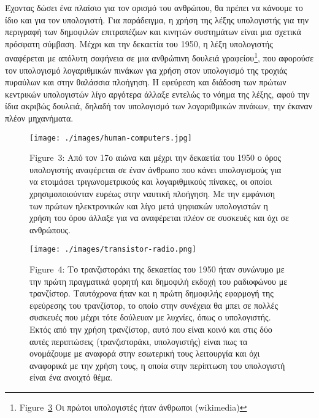\documentclass[
]{article}
\begin{document}
Έχοντας δώσει ένα πλαίσιο για τον ορισμό του ανθρώπου, θα πρέπει να
κάνουμε το ίδιο και για τον υπολογιστή. Για παράδειγμα, η χρήση της
λέξης υπολογιστής για την περιγραφή των δημοφιλών επιτραπέζιων και
κινητών συστημάτων είναι μια σχετικά πρόσφατη σύμβαση. Μέχρι και την
δεκαετία του 1950, η λέξη υπολογιστής αναφέρεται με απόλυτη σαφήνεια σε
μια ανθρώπινη δουλειά γραφείου\footnote{Figure~\protect\hyperlink{fig:human-computers}{3}
  Οι πρώτοι υπολογιστές ήταν άνθρωποι (wikimedia)}, που αφορούσε τον
υπολογισμό λογαριθμικών πινάκων για χρήση στον υπολογισμό της τροχιάς
πυραύλων και στην θαλάσσια πλοήγηση. Η εφεύρεση και διάδοση των πρώτων
κεντρικών υπολογιστών λίγο αργότερα άλλαξε εντελώς το νόημα της λέξης,
αφού την ίδια ακριβώς δουλειά, δηλαδή τον υπολογισμό των λογαριθμικών
πινάκων, την έκαναν πλέον μηχανήματα.

\leavevmode{}%
\begin{figure}
\hypertarget{fig:human-computers}{%
\centering
\texttt{[image: ./images/human-computers.jpg]}
\caption{Figure~3: Από τον 17ο αιώνα και μέχρι την δεκαετία του 1950 ο
όρος υπολογιστής αναφέρεται σε έναν άνθρωπο που κάνει υπολογισμούς για
να ετοιμάσει τριγωνομετρικούς και λογαριθμικούς πίνακες, οι οποίοι
χρησιμοποιούνταν ευρέως στην ναυτική πλοήγηση. Με την εμφάνιση των
πρώτων ηλεκτρονικών και λίγο μετά ψηφιακών υπολογιστών η χρήση του όρου
άλλαξε για να αναφέρεται πλέον σε συσκευές και όχι σε
ανθρώπους.}\label{fig:human-computers}
}
\end{figure}

\leavevmode{}%
\begin{figure}
\hypertarget{fig:transistor-radio}{%
\centering
\texttt{[image: ./images/transistor-radio.png]}
\caption{Figure~4: Το τρανζιστοράκι της δεκαετίας του 1950 ήταν συνώνυμο
με την πρώτη πραγματικά φορητή και δημοφιλή εκδοχή του ραδιοφώνου με
τρανζίστορ. Ταυτόχρονα ήταν και η πρώτη δημοφιλής εφαρμογή της εφεύρεσης
του τρανζίστορ, το οποίο στην συνέχεια θα μπει σε πολλές συσκευές που
μέχρι τότε δούλευαν με λυχνίες, όπως ο υπολογιστής. Εκτός από την χρήση
τρανζίστορ, αυτό που είναι κοινό και στις δύο αυτές περιπτώσεις
(τρανζιστοράκι, υπολογιστής) είναι πως τα ονομάζουμε με αναφορά στην
εσωτερική τους λειτουργία και όχι αναφορικά με την χρήση τους, η οποία
στην περίπτωση του υπολογιστή είναι ένα ανοιχτό
θέμα.}\label{fig:transistor-radio}
}
\end{figure}
\end{document}
